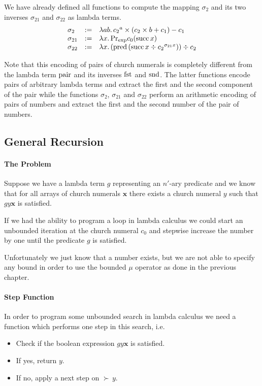 We have already defined all functions to compute the mapping $\sigma_2$ and its two
inverses $\sigma_{21}$ and $\sigma_{22}$ as lambda terms.
$$
\begin{array}{lll}
  \sigma_2 &:= &\lambda a b.\,  {c_2}^a \times (c_2 \times b + c_1) - c_1
  \\
  \sigma_{21} &:=& \lambda x.\, \text{Pr}_{\text{exp}} c_0 (\text{succ}\, x)
  \\
  \sigma_{22} &:=& \lambda x.\,(\text{pred}\, (\text{succ}\, x\div {c_2}^{\sigma_{21} x}))
                   \div c_2
\end{array}
$$

Note that this encoding of pairs of church numerals is completely different
from the lambda term $\text{pair}$ and its inverses $\text{fst}$ and $\text{snd}$. The latter
functions encode pairs of arbitrary lambda terms and extract the first and the
second component of the pair while the functions $\sigma_2$, $\sigma_{21}$ and
$\sigma_{22}$ perform an arithmetic encoding of pairs of numbers and extract
the first and the second number of the pair of numbers.




\subsection{General Recursion}

\paragraph{The Problem} Suppose we have a lambda term $g$ representing an
$n'$-ary predicate and we know that for all arrays of church numerals
$\mathbf{x}$ there exists a church numeral $y$ such that $g y \mathbf{x}$ is
satisfied.

If we had the ability to program a loop in lambda calculus we could start an
unbounded iteration at the church numeral $c_0$ and stepwise increase the
number by one until the predicate $g$ is satisfied.

Unfortunately we just know that a number exists, but we are not able to
specify any bound in order to use the bounded $\mu$ operator as done in the
previous chapter.

\paragraph{Step Function} In order to program some unbounded search in lambda
calculus we need a function which performs one step in this search, i.e.
\begin{itemize}
\item Check if the boolean expression $g y \mathbf{x}$ is satisfied.
\item If yes, return $y$.
\item If no, apply a next step on $\succ\, y$.
\end{itemize}

